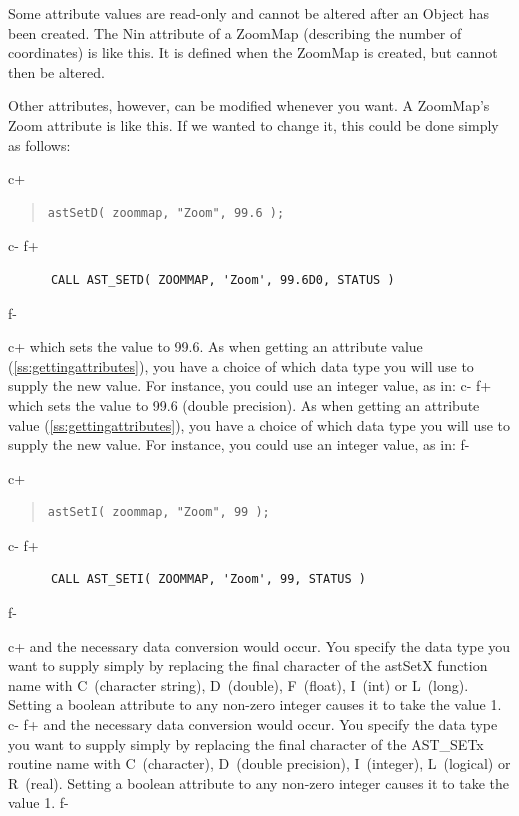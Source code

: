 \documentclass[twoside,11pt]{article}
\newcommand{\secref}[1]{\S\ref{#1}}
\renewcommand{\secref}[1]{\ref{#1}}
\begin{document}
Some attribute values are read-only and cannot be altered after an
Object has been created. The Nin attribute of a ZoomMap (describing
the number of coordinates) is like this. It is defined when the
ZoomMap is created, but cannot then be altered.

Other attributes, however, can be modified whenever you want. A
ZoomMap's Zoom attribute is like this. If we wanted to change it, this
could be done simply as follows:

c+
\begin{quote}
\small
\begin{verbatim}
astSetD( zoommap, "Zoom", 99.6 );
\end{verbatim}
\normalsize
\end{quote}
c-
f+
\small
\begin{verbatim}
      CALL AST_SETD( ZOOMMAP, 'Zoom', 99.6D0, STATUS )
\end{verbatim}
\normalsize
f-

c+
which sets the value to 99.6. As when getting an attribute value
(\secref{ss:gettingattributes}), you have a choice of which data type
you will use to supply the new value. For instance, you could use an
integer value, as in:
c-
f+
which sets the value to 99.6 (double precision). As when getting an
attribute value (\secref{ss:gettingattributes}), you have a choice of
which data type you will use to supply the new value. For instance,
you could use an integer value, as in:
f-

c+
\begin{quote}
\small
\begin{verbatim}
astSetI( zoommap, "Zoom", 99 );
\end{verbatim}
\normalsize
\end{quote}
c-
f+
\small
\begin{verbatim}
      CALL AST_SETI( ZOOMMAP, 'Zoom', 99, STATUS )
\end{verbatim}
\normalsize
f-

c+
and the necessary data conversion would occur.  You specify the data
type you want to supply simply by replacing the final character of the
astSetX function name with C~(character string), D~(double),
F~(float), I~(int) or L~(long). Setting a boolean attribute to any
non-zero integer causes it to take the value 1.
c-
f+
and the necessary data conversion would occur.  You specify the data
type you want to supply simply by replacing the final character of the
AST\_SETx routine name with C~(character), D~(double precision),
I~(integer), L~(logical) or R~(real).  Setting a boolean attribute to
any non-zero integer causes it to take the value 1.
f-
\end{document}
